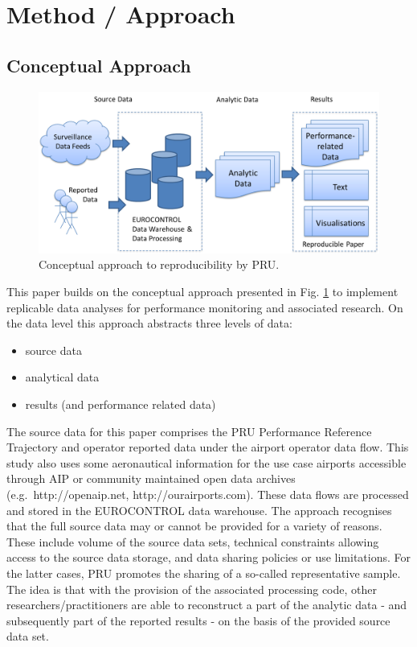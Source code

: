\documentclass[conference,final,a4paper,]{IEEEtran}
\providecommand{\tightlist}{%
  \setlength{\itemsep}{0pt}\setlength{\parskip}{0pt}}
\begin{document}
\hypertarget{method-approach}{%
\section{Method / Approach}\label{method-approach}}

\hypertarget{conceptual-approach}{%
\subsection{Conceptual Approach}\label{conceptual-approach}}



\begin{figure}[hbt]

{\centering \includegraphics[width=1\linewidth]{figures/approach-stages} 

}

\caption{Conceptual approach to reproducibility by PRU.}\label{fig:concept-approach}
\end{figure}

This paper builds on the conceptual approach presented in Fig. \ref{fig:concept-approach} to implement replicable data analyses for performance monitoring and associated research.
On the data level this approach abstracts three levels of data:

\begin{itemize}
\tightlist
\item
  source data
\item
  analytical data
\item
  results (and performance related data)
\end{itemize}

The source data for this paper comprises the PRU Performance Reference Trajectory and operator reported data under the airport operator data flow. This study also uses some aeronautical information for the use case airports accessible through AIP or community maintained open data archives (e.g.~http://openaip.net, http://ourairports.com).
These data flows are processed and stored in the EUROCONTROL data warehouse.
The approach recognises that the full source data may or cannot be provided for a variety of reasons.
These include volume of the source data sets, technical constraints allowing access to the source data storage, and data sharing policies or use limitations.
For the latter cases, PRU promotes the sharing of a so-called representative sample.
The idea is that with the provision of the associated processing code, other researchers/practitioners are able to reconstruct a part of the analytic data - and subsequently part of the reported results - on the basis of the provided source data set.
\end{document}
